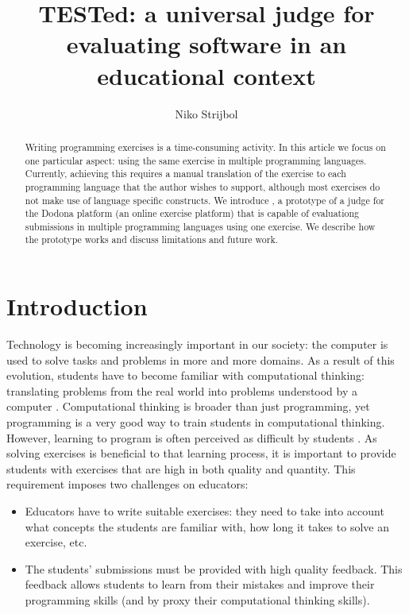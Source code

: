 \documentclass[5p,number]{elsarticle}
\title{TESTed: a universal judge for evaluating software in an educational context}
\author{Niko Strijbol\corref{cor1}}
\begin{document}
    \setmainfont[Ligatures=TeX,Numbers=OldStyle,Contextuals=Alternate]{Libertinus Serif}
    \setsansfont[Ligatures=TeX,Numbers=OldStyle,Contextuals=Alternate]{Libertinus Sans}
    \setmonofont[Scale=MatchLowercase,Contextuals={Alternate}]{Jetbrains Mono}

    \begin{abstract}
        Writing programming exercises is a time-consuming activity.
        In this article we focus on one particular aspect: using the same exercise in multiple programming languages.
        Currently, achieving this requires a manual translation of the exercise to each programming language that the author wishes to support, although most exercises do not make use of language specific constructs.
        We introduce \tested{}, a prototype of a judge for the Dodona platform (an online exercise platform) that is capable of evaluationg submissions in multiple programming languages using one exercise.
        We describe how the prototype works and discuss limitations and future work.
    \end{abstract}

    \maketitle

    \section{Introduction}\label{sec:introduction}
    
    Technology is becoming increasingly important in our society: the computer is used to solve tasks and problems in more and more domains.
    As a result of this evolution, students have to become familiar with computational thinking: translating problems from the real world into problems understood by a computer \cite{bastiaensen2017}.
    Computational thinking is broader than just programming, yet programming is a very good way to train students in computational thinking.
    However, learning to program is often perceived as difficult by students \cite{10.1145/3293881.3295779}.
    As solving exercises is beneficial to that learning process, it is important to provide students with exercises that are high in both quality and quantity.
    This requirement imposes two challenges on educators:

    \begin{itemize}
        \item Educators have to write suitable exercises: they need to take into account what concepts the students are familiar with, how long it takes to solve an exercise, etc.
        \item The students' submissions must be provided with high quality feedback.
        This feedback allows students to learn from their mistakes and improve their programming skills (and by proxy their computational thinking skills).
    \end{itemize}
\end{document}
